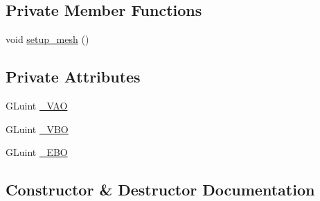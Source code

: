 \subsection*{Private Member Functions}
\begin{DoxyCompactItemize}
\item 
void \hyperlink{classLarp_1_1Mesh_af1c7441ca21e77717edc513865c49c93}{setup\+\_\+mesh} ()
\end{DoxyCompactItemize}
\subsection*{Private Attributes}
\begin{DoxyCompactItemize}
\item 
G\+Luint \hyperlink{classLarp_1_1Mesh_acba7ec21576ff64c769df9d374ed1cc5}{\+\_\+\+V\+AO}
\item 
G\+Luint \hyperlink{classLarp_1_1Mesh_a72ad2a0ac19c617fc9abc4f48fd99350}{\+\_\+\+V\+BO}
\item 
G\+Luint \hyperlink{classLarp_1_1Mesh_afffcf16bfa3010c480a9a09fd43a477e}{\+\_\+\+E\+BO}
\end{DoxyCompactItemize}


\subsection{Constructor \& Destructor Documentation}
